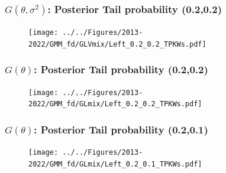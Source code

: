 \documentclass[10pt,mathserif,aspectratio=169]{beamer}
\begin{document}
\begin{frame}
  \frametitle{$G(\theta,\sigma^2)$: Posterior Tail probability (0.2,0.2)}
  \begin{figure}
    \centering
    \texttt{[image: ../../Figures/2013-2022/GMM\_fd/GLVmix/Left\_0.2\_0.2\_TPKWs.pdf]}
  \end{figure}
\end{frame}




\begin{frame}
  \frametitle{$G(\theta)$: Posterior Tail probability (0.2,0.2)}
  \begin{figure}
    \centering
    \texttt{[image: ../../Figures/2013-2022/GMM\_fd/GLmix/Left\_0.2\_0.2\_TPKWs.pdf]}
  \end{figure}
\end{frame}

\begin{frame}[label=tpselect]
  \frametitle{$G(\theta)$: Posterior Tail probability (0.2,0.1)}
  \begin{figure}
    \centering
    \texttt{[image: ../../Figures/2013-2022/GMM\_fd/GLmix/Left\_0.2\_0.1\_TPKWs.pdf]}
  \end{figure}
  \hyperlink{tpcontour}{}
\end{frame}
\end{document}
